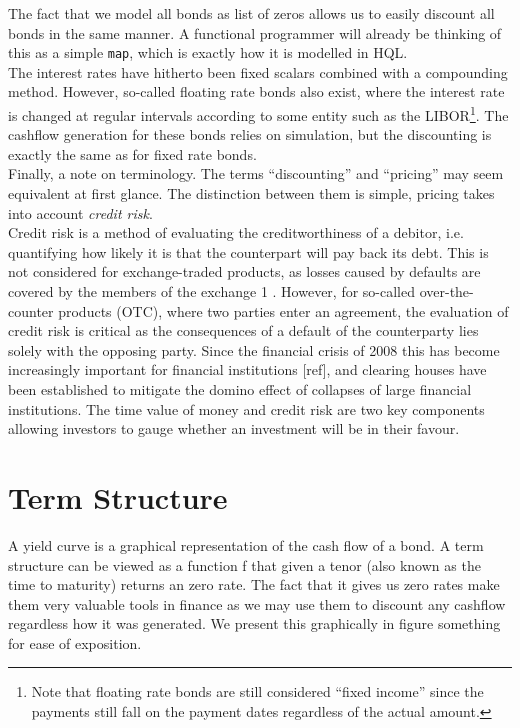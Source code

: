 The fact that we model all bonds as list of zeros allows us to easily discount 
all bonds in the same manner. A functional programmer will already be thinking 
of this as a simple \texttt{map}, which is exactly how it is modelled in HQL.\\

The interest rates have hitherto been fixed scalars combined with a compounding 
method. However, so-called floating rate bonds also exist, where the interest 
rate is changed at regular intervals according to some entity such as the 
LIBOR\footnote{Note that floating rate bonds are still considered “fixed 
income” since the payments still fall on the payment dates regardless of the 
actual amount.}. The cashflow generation for these bonds relies on simulation, 
but the discounting is exactly the same as for fixed rate bonds.\\

Finally, a note on terminology. The terms “discounting” and “pricing” 
may seem equivalent at first glance. The distinction between them is simple, 
pricing takes into account \emph{credit risk}. \\

Credit risk is a method of evaluating the creditworthiness of a debitor, i.e. 
quantifying
how likely it is that the counterpart will pay back its debt. This is not 
considered for
exchange-traded products, as losses caused by defaults are covered by the 
members of the exchange 1 . However, for so-called over-the-counter products 
(OTC), where two parties enter an agreement, the evaluation of credit risk is 
critical as the consequences of a default of the counterparty lies solely with 
the opposing party. Since the financial crisis of 2008 this has become 
increasingly important for financial institutions [ref], and clearing houses 
have been established to mitigate the domino effect of collapses of large 
financial institutions. The time value of money and credit risk are two key 
components allowing investors to gauge whether an investment will be in their 
favour.

\section{Term Structure}

A yield curve is a graphical representation of the cash flow of a bond.
A term structure can be viewed as a function f that given a tenor (also known 
as the time to maturity) returns an zero rate. The fact that it gives us zero 
rates make them very valuable tools in finance as we may use them to discount 
any cashflow regardless how it was generated.
We present this graphically in figure something for ease of exposition.

